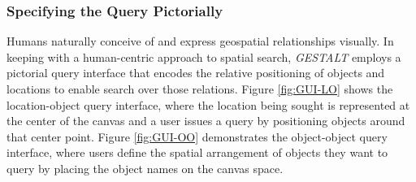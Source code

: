 \subsubsection{Specifying the Query Pictorially}
Humans naturally conceive of and express geospatial relationships visually.
In keeping with a human-centric approach to spatial search, \emph{GESTALT} employs a pictorial query interface that encodes the relative positioning of objects and locations to enable search over those relations.
Figure \ref{fig:GUI-LO} shows the location-object query interface, where the location being sought is represented at the center of the canvas and a user issues a query by positioning objects around that center point. 
Figure \ref{fig:GUI-OO} demonstrates the object-object query interface, where users define the spatial arrangement of objects they want to query by placing the object names on the canvas space. 

